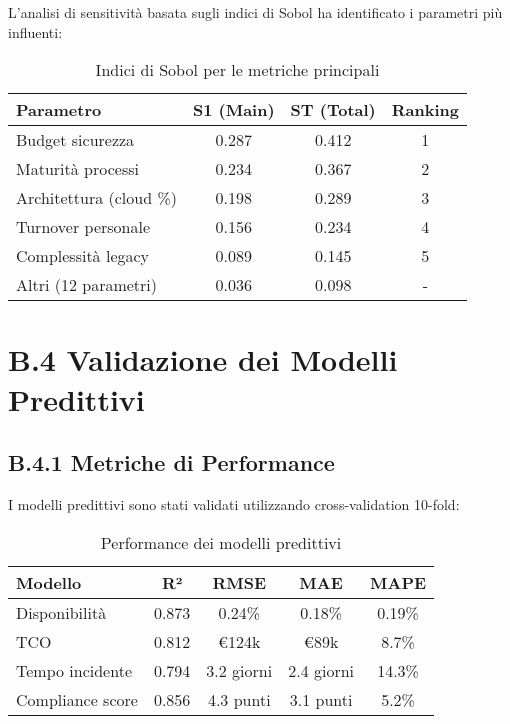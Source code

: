 L'analisi di sensitività basata sugli indici di Sobol ha identificato i parametri più influenti:

\begin{table}[htbp]
\centering
\caption{Indici di Sobol per le metriche principali}
\begin{tabular}{|l|c|c|c|}
\hline
\textbf{Parametro} & \textbf{S1 (Main)} & \textbf{ST (Total)} & \textbf{Ranking} \\
\hline
Budget sicurezza & 0.287 & 0.412 & 1 \\
Maturità processi & 0.234 & 0.367 & 2 \\
Architettura (cloud \%) & 0.198 & 0.289 & 3 \\
Turnover personale & 0.156 & 0.234 & 4 \\
Complessità legacy & 0.089 & 0.145 & 5 \\
Altri (12 parametri) & 0.036 & 0.098 & - \\
\hline
\end{tabular}
\end{table}

\section{B.4 Validazione dei Modelli Predittivi}

\subsection{B.4.1 Metriche di Performance}

I modelli predittivi sono stati validati utilizzando cross-validation 10-fold:

\begin{table}[htbp]
\centering
\caption{Performance dei modelli predittivi}
\begin{tabular}{|l|c|c|c|c|}
\hline
\textbf{Modello} & \textbf{R²} & \textbf{RMSE} & \textbf{MAE} & \textbf{MAPE} \\
\hline
Disponibilità & 0.873 & 0.24\% & 0.18\% & 0.19\% \\
TCO & 0.812 & €124k & €89k & 8.7\% \\
Tempo incidente & 0.794 & 3.2 giorni & 2.4 giorni & 14.3\% \\
Compliance score & 0.856 & 4.3 punti & 3.1 punti & 5.2\% \\
\hline
\end{tabular}
\end{table}
